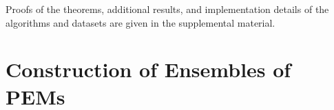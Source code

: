 \documentclass[10pt,journal,compsoc]{IEEEtran}
\theoremstyle{definition}
\theoremstyle{definition}
\theoremstyle{remark}
\theoremstyle{remark}
\theoremstyle{remark}
\begin{document}

Proofs of the theorems, additional results, and implementation details of the algorithms and datasets are given in the supplemental material.

\section{Construction of Ensembles of PEMs}
\label{sec2}
\end{document}
